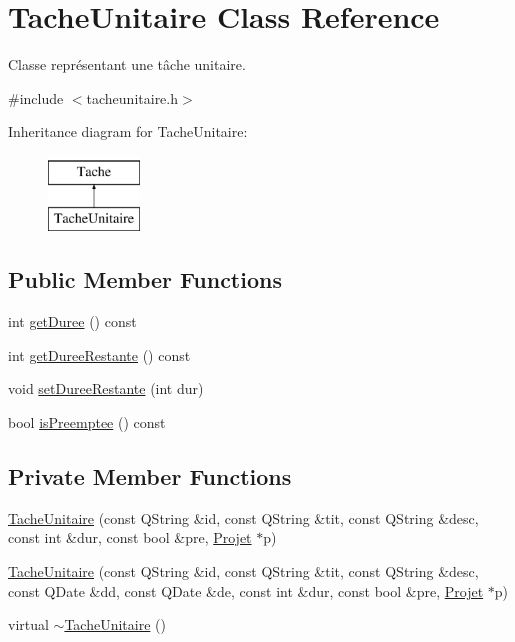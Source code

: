 \hypertarget{class_tache_unitaire}{}\section{Tache\+Unitaire Class Reference}
\label{class_tache_unitaire}


Classe représentant une tâche unitaire.  




{\ttfamily \#include $<$tacheunitaire.\+h$>$}

Inheritance diagram for Tache\+Unitaire\+:\begin{figure}[H]
\begin{center}
\leavevmode
\includegraphics[height=2.000000cm]{class_tache_unitaire}
\end{center}
\end{figure}
\subsection*{Public Member Functions}
\begin{DoxyCompactItemize}
\item 
int \hyperlink{class_tache_unitaire_a2f1c93887c652e5581df4357bc72949b}{get\+Duree} () const 
\item 
int \hyperlink{class_tache_unitaire_aa9b7e58e61dfded16d5a2508d33734c5}{get\+Duree\+Restante} () const 
\item 
void \hyperlink{class_tache_unitaire_a5b1dc4cb5b374fce9c26abb4c954cef8}{set\+Duree\+Restante} (int dur)
\item 
bool \hyperlink{class_tache_unitaire_a4a25bc2f0b3e6ebd6c0617d22328c986}{is\+Preemptee} () const 
\end{DoxyCompactItemize}
\subsection*{Private Member Functions}
\begin{DoxyCompactItemize}
\item 
\hyperlink{class_tache_unitaire_acca628b1c239bf191fbbf869ad15cdd2}{Tache\+Unitaire} (const Q\+String \&id, const Q\+String \&tit, const Q\+String \&desc, const int \&dur, const bool \&pre, \hyperlink{class_projet}{Projet} $\ast$p)
\item 
\hyperlink{class_tache_unitaire_ab97fdcb6d8d43ff76d46a7ae650eba3d}{Tache\+Unitaire} (const Q\+String \&id, const Q\+String \&tit, const Q\+String \&desc, const Q\+Date \&dd, const Q\+Date \&de, const int \&dur, const bool \&pre, \hyperlink{class_projet}{Projet} $\ast$p)
\item 
virtual \hyperlink{class_tache_unitaire_a54c9937fb3088c48348883ad1b385f8c}{$\sim$\+Tache\+Unitaire} ()
\end{DoxyCompactItemize}
